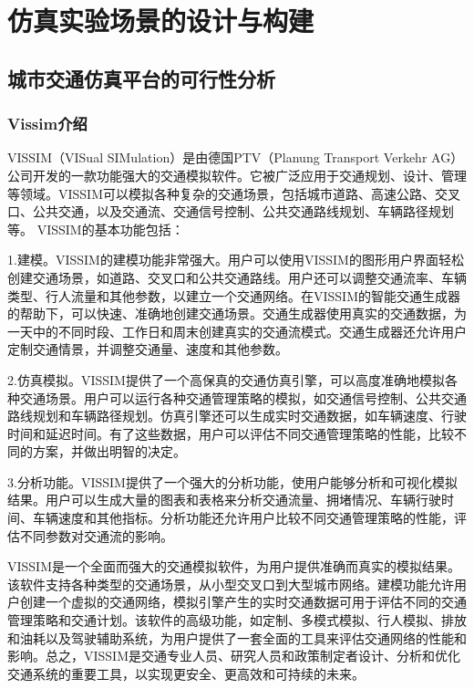 \chapter{仿真实验场景的设计与构建}

\section{城市交通仿真平台的可行性分析}

\subsection{Vissim介绍}

VISSIM（VISual SIMulation）是由德国PTV（Planung Transport Verkehr AG）公司开发的一款功能强大的交通模拟软件。它被广泛应用于交通规划、设计、管理等领域。VISSIM可以模拟各种复杂的交通场景，包括城市道路、高速公路、交叉口、公共交通，以及交通流、交通信号控制、公共交通路线规划、车辆路径规划等。
VISSIM的基本功能包括：

1.建模。VISSIM的建模功能非常强大。用户可以使用VISSIM的图形用户界面轻松创建交通场景，如道路、交叉口和公共交通路线。用户还可以调整交通流率、车辆类型、行人流量和其他参数，以建立一个交通网络。在VISSIM的智能交通生成器的帮助下，可以快速、准确地创建交通场景。交通生成器使用真实的交通数据，为一天中的不同时段、工作日和周末创建真实的交通流模式。交通生成器还允许用户定制交通情景，并调整交通量、速度和其他参数。

2.仿真模拟。VISSIM提供了一个高保真的交通仿真引擎，可以高度准确地模拟各种交通场景。用户可以运行各种交通管理策略的模拟，如交通信号控制、公共交通路线规划和车辆路径规划。仿真引擎还可以生成实时交通数据，如车辆速度、行驶时间和延迟时间。有了这些数据，用户可以评估不同交通管理策略的性能，比较不同的方案，并做出明智的决定。

3.分析功能。VISSIM提供了一个强大的分析功能，使用户能够分析和可视化模拟结果。用户可以生成大量的图表和表格来分析交通流量、拥堵情况、车辆行驶时间、车辆速度和其他指标。分析功能还允许用户比较不同交通管理策略的性能，评估不同参数对交通流的影响。

VISSIM是一个全面而强大的交通模拟软件，为用户提供准确而真实的模拟结果。该软件支持各种类型的交通场景，从小型交叉口到大型城市网络。建模功能允许用户创建一个虚拟的交通网络，模拟引擎产生的实时交通数据可用于评估不同的交通管理策略和交通计划。该软件的高级功能，如定制、多模式模拟、行人模拟、排放和油耗以及驾驶辅助系统，为用户提供了一套全面的工具来评估交通网络的性能和影响。总之，VISSIM是交通专业人员、研究人员和政策制定者设计、分析和优化交通系统的重要工具，以实现更安全、更高效和可持续的未来。


